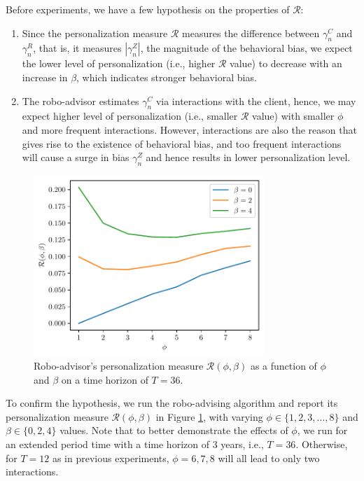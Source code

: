 Before experiments, we have a few hypothesis on the properties of $\mathcal R$:\begin{enumerate}
    \item Since the personalization measure $\mathcal{R}$ measures the difference between $\gamma_n^C$ and $\gamma_n^R$, that is, it measures $|\gamma_n^Z|$, the magnitude of the behavioral bias, we expect the lower level of personalization (i.e., higher $\mathcal R$ value) to decrease with an increase in $\beta$, which indicates stronger behavioral bias.
    \item The robo-advisor estimates $\gamma_n^C$ via interactions with the client, hence, we may expect higher level of personalization (i.e., smaller $\mathcal R$ value) with smaller $\phi$ and more frequent interactions. However, interactions are also the reason that gives rise to the existence of behavioral bias, and too frequent interactions will cause a surge in bias $\gamma_n^Z$ and hence results in lower personalization level. 
\end{enumerate}

\begin{figure}[t]
    \centering
    \includegraphics[width=87mm]{imgs/personalization.pdf}
    \caption{Robo-advisor's personalization measure $\mathcal R(\phi,\beta)$ as a function of $\phi$ and $\beta$ on a time horizon of $T=36$.}
    \label{fig:personalization}
\end{figure}

To confirm the hypothesis, we run the robo-advising algorithm and report its personalization measure $\mathcal R(\phi,\beta)$ in Figure \ref{fig:personalization}, with varying $\phi\in\{1,2,3,\ldots,8\}$ and $\beta\in\{0,2,4\}$ values. Note that to better demonstrate the effects of $\phi$, we run for an extended period time with a time horizon of 3 years, i.e., $T=36$. Otherwise, for $T=12$ as in previous experiments, $\phi=6,7,8$ will all lead to only two interactions.


